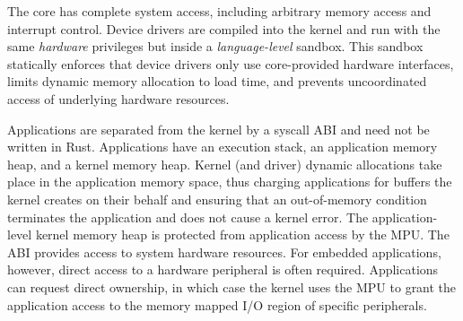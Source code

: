 
The \name core has complete system access, including arbitrary memory
access and interrupt control. Device drivers are compiled into the kernel and
run with the same \emph{hardware} privileges but inside a
\emph{language-level} sandbox. This sandbox statically enforces that device
drivers only use core-provided hardware interfaces, limits dynamic memory
allocation to load time, and prevents uncoordinated access of underlying
hardware resources.

Applications are separated from the kernel by a syscall ABI and need not be
written in Rust. Applications have an execution stack, an application memory
heap, and a kernel memory heap. Kernel (and driver) dynamic allocations take
place in the application memory space, thus charging applications for buffers
the kernel creates on their behalf and ensuring that an out-of-memory
condition terminates the application and does not cause a kernel error. The
application-level kernel memory heap is protected from application access by the
MPU.
%
The ABI provides access to system hardware resources. For embedded applications,
however, direct access to a hardware peripheral is often required.
Applications can request direct ownership, in which case the kernel uses the
MPU to grant the application access to the memory mapped I/O region of
specific peripherals.





